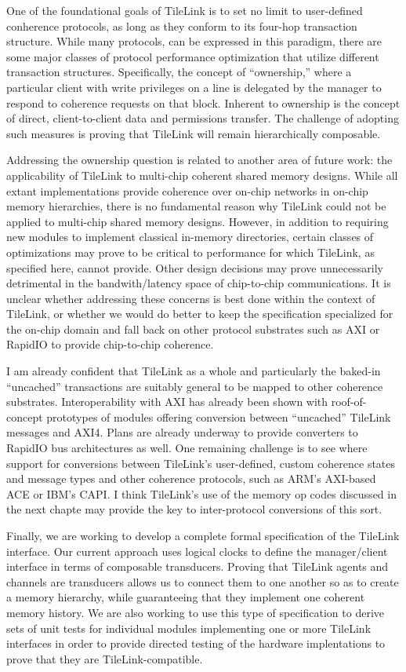 One of the foundational goals of TileLink is to set no limit to user-defined conherence protocols, as long as they conform to
its four-hop transaction structure.
While many protocols, can be expressed in this paradigm, there are some major classes of protocol performance optimization that
utilize different transaction structures.
Specifically, the concept of ``ownership,'' where a particular client with write privileges on a line is delegated by the manager
to respond to coherence requests on that block.
Inherent to ownership is the concept of direct, client-to-client data and permissions transfer.
The challenge of adopting such measures is proving that TileLink will remain hierarchically composable.

Addressing the ownership question is related to another area of future work:
the applicability of TileLink to multi-chip coherent shared memory designs.
While all extant implementations provide coherence over on-chip networks in on-chip memory hierarchies,
there is no fundamental reason why TileLink could not be applied to multi-chip shared memory designs.
However, in addition to requiring new modules to implement classical in-memory directories,
certain classes of optimizations may prove to be critical to performance for which TileLink, as specified here, cannot provide.
Other design decisions may prove unnecessarily detrimental in the bandwith/latency space of chip-to-chip communications.
It is unclear whether addressing these concerns is best done within the context of TileLink, or whether we would
do better to keep the specification specialized for the on-chip domain and fall back on other
protocol substrates such as AXI or RapidIO to provide chip-to-chip coherence. 

I am already confident that TileLink as a whole and particularly the baked-in ``uncached'' transactions are suitably general to be mapped to 
other coherence substrates.
Interoperability with AXI has already been shown with roof-of-concept prototypes of modules offering conversion between ``uncached'' TileLink messages and AXI4.
Plans are already underway to provide converters to RapidIO bus architectures as well.
One remaining challenge is to see where support for conversions between TileLink's user-defined, custom coherence states and message types and other coherence protocols,
such as ARM's AXI-based ACE or IBM's CAPI.
I think TileLink's use of the memory op codes discussed in the next chapte may provide the key to inter-protocol conversions of this sort.

Finally, we are working to develop a complete formal specification of the TileLink interface.
Our current approach uses logical clocks to define the manager/client interface in terms of composable transducers.
Proving that TileLink agents and channels are transducers allows us to connect them to one another so as to create a memory hierarchy,
while guaranteeing that they implement one coherent memory history.
We are also working to use this type of specification to derive sets of unit tests for individual modules implementing one or more TileLink interfaces
in order to provide directed testing of the hardware implentations to prove that they are TileLink-compatible.

